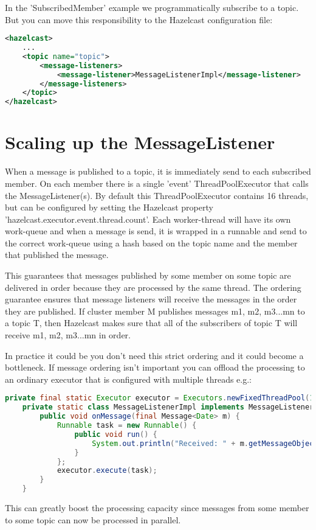 In the 'SubscribedMember' example we programmatically subscribe to a topic. But you can move this responsibility to the  Hazelcast configuration file:
\begin{lstlisting}[language=xml]
<hazelcast>
    ...
    <topic name="topic">
        <message-listeners>
            <message-listener>MessageListenerImpl</message-listener>
        </message-listeners>
    </topic>
</hazelcast>
\end{lstlisting}

\section{Scaling up the MessageListener}
When a message is published to a topic, it is immediately send to each subscribed member. On each member there is a single 'event' ThreadPoolExecutor that calls the MessageListener(s). By default this ThreadPoolExecutor contains 16 threads, but can be configured by setting the Hazelcast property 'hazelcast.executor.event.thread.count'. Each worker-thread will have its own work-queue and when a message is send, it is wrapped in a runnable and send to the correct work-queue using a hash based on the topic name and the member that published the message.

This guarantees that messages published by some member on some topic are delivered in order because they are processed by the same thread. The ordering guarantee ensures that message listeners will receive the messages in the order they are published. If cluster member M publishes messages m1, m2, m3...mn to a topic T, then Hazelcast makes sure that all of the subscribers of topic T will receive m1, m2, m3...mn in order. 

In practice it could be you don't need this strict ordering and it could become a bottleneck. If message ordering isn't important you can offload the processing to an ordinary executor that is configured with multiple threads e.g.:
\begin{lstlisting}[language=java]
    private final static Executor executor = Executors.newFixedThreadPool(10);       
    private static class MessageListenerImpl implements MessageListener<Date> {
        public void onMessage(final Message<Date> m) {
            Runnable task = new Runnable() {
                public void run() {
                    System.out.println("Received: " + m.getMessageObject());
                }
            };
            executor.execute(task);
        }
    } 
\end{lstlisting}
This can greatly boost the processing capacity since messages from some member to some topic can now be processed in parallel.

